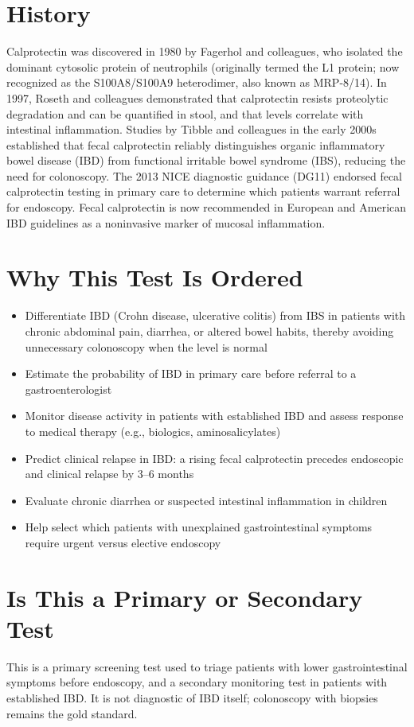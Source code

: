 \section*{History}
Calprotectin was discovered in 1980 by Fagerhol and colleagues, who isolated the dominant cytosolic protein of neutrophils (originally termed the L1 protein; now recognized as the S100A8/S100A9 heterodimer, also known as MRP-8/14). In 1997, Roseth and colleagues demonstrated that calprotectin resists proteolytic degradation and can be quantified in stool, and that levels correlate with intestinal inflammation. Studies by Tibble and colleagues in the early 2000s established that fecal calprotectin reliably distinguishes organic inflammatory bowel disease (IBD) from functional irritable bowel syndrome (IBS), reducing the need for colonoscopy. The 2013 NICE diagnostic guidance (DG11) endorsed fecal calprotectin testing in primary care to determine which patients warrant referral for endoscopy. Fecal calprotectin is now recommended in European and American IBD guidelines as a noninvasive marker of mucosal inflammation.
\section*{Why This Test Is Ordered}
\begin{itemize}
  \item Differentiate IBD (Crohn disease, ulcerative colitis) from IBS in patients with chronic abdominal pain, diarrhea, or altered bowel habits, thereby avoiding unnecessary colonoscopy when the level is normal
  \item Estimate the probability of IBD in primary care before referral to a gastroenterologist
  \item Monitor disease activity in patients with established IBD and assess response to medical therapy (e.g., biologics, aminosalicylates)
  \item Predict clinical relapse in IBD: a rising fecal calprotectin precedes endoscopic and clinical relapse by 3--6 months
  \item Evaluate chronic diarrhea or suspected intestinal inflammation in children
  \item Help select which patients with unexplained gastrointestinal symptoms require urgent versus elective endoscopy
\end{itemize}
\section*{Is This a Primary or Secondary Test}
This is a primary screening test used to triage patients with lower gastrointestinal symptoms before endoscopy, and a secondary monitoring test in patients with established IBD. It is not diagnostic of IBD itself; colonoscopy with biopsies remains the gold standard.

